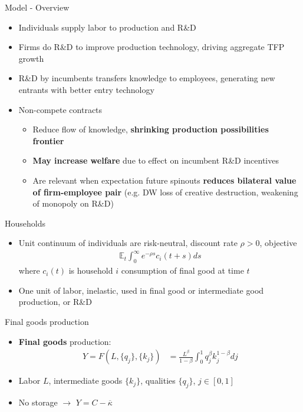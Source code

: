\documentclass[english,usenames,dvipsnames]{beamer}
\begin{document}
\begin{frame}{Model - Overview}
\begin{itemize}
	\item Individuals supply labor to production and R\&D
	\item Firms do R\&D to improve production technology, driving aggregate TFP growth
	\item R\&D by incumbents transfers knowledge to employees, generating new entrants with better entry technology
	\item Non-compete contracts
	\begin{itemize}
		\item Reduce flow of knowledge, \textbf{\alert{shrinking production possibilities frontier}}
		\item \textbf{\alert{May increase welfare}} due to effect on incumbent R\&D incentives
		\item Are relevant when expectation future spinouts \textbf{\alert{reduces bilateral value of firm-employee pair}} (e.g. DW loss of creative destruction, weakening of monopoly on R\&D)
	\end{itemize}
\end{itemize}
\end{frame}


\begin{frame}{Households}
\begin{itemize}
	\item Unit continuum of individuals are risk-neutral, discount rate $\rho > 0$, objective
	\begin{align*}
	\mathbb{E}_t \int_0^{\infty} e^{-\rho s} c_i(t+s) ds
	\end{align*}
	where $c_i(t)$ is household $i$ consumption of final good at time $t$
	\item One unit of labor, inelastic, used in final good or intermediate good production, or R\&D
\end{itemize}
\end{frame}

\begin{frame}{Final goods production}
\begin{itemize}
	\item \textbf{Final goods} production:
	\begin{align*}
	Y = F(L,\{q_j\},\{k_j\}) &= \frac{L^{\beta}}{1-\beta} \int_0^1 q_j^{\beta} k_j^{1-\beta}  dj 
	\end{align*}
	\item Labor $L$, intermediate goods $\{k_j\}$, qualities $\{q_j\}$, $j \in [0,1]$
	\item No storage $\rightarrow$ $Y = C - \overline{\kappa}$
\end{itemize}
\end{frame}
\end{document}
